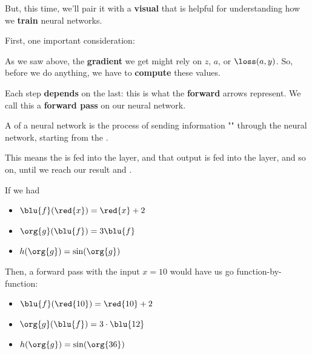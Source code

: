         But, this time, we'll pair it with a \textbf{visual} that is helpful for understanding how we \textbf{train} neural networks. 
        
        First, one important consideration:
        
        As we saw above, the \textbf{gradient} we get might rely on $z$, $a$, or $\loss(a,y)$. So, before we do anything, we have to \textbf{compute} these values.
        
        Each step \textbf{depends} on the last: this is what the \textbf{forward} arrows represent. We call this a \textbf{forward pass} on our neural network.\\
        
        \begin{definition}
            A  of a neural network is the process of sending information "" through the neural network, starting from the .
            
            This means the  is fed into the  layer, and that output is fed into the  layer, and so on, until we reach our  result and .
        \end{definition}
        
        \miniex If we had 
        
        \begin{itemize}
            \item $\blu{f}(\red{x}) = \red{x}+2$
            
            \item $\org{g}(\blu{f}) = 3\blu{f}$
            
            \item $h(\org{g}) = \sin(\org{g})$
        \end{itemize}
        
        Then, a forward pass with the input $x=10$ would have us go function-by-function:
        
        \begin{itemize}
            \item $\blu{f}(\red{10}) = \red{10}+2$
            
            \item $\org{g}(\blu{f}) = 3 \cdot \blu{12}$
            
            \item $h(\org{g}) = \sin(\org{36})$
        \end{itemize}
        
